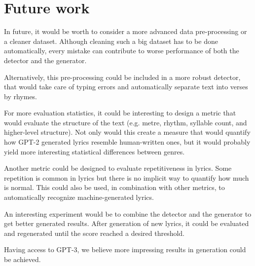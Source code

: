 \section*{Future work}
In future, it would be worth to consider a more advanced data pre-processing or a cleaner dataset. Although cleaning such a big dataset has to be done automatically, every mistake can contribute to worse performance of both the detector and the generator. 

Alternatively, this pre-processing could be included in a more robust detector, that would take care of typing errors and automatically separate text into verses by rhymes.

For more evaluation statistics, it could be interesting to design a metric that would evaluate the structure of the text (e.g. metre, rhythm, syllable count, and higher-level structure). Not only would this create a measure that would quantify how GPT-2 generated lyrics resemble human-written ones, but it would probably yield more interesting statistical differences between genres.

Another metric could be designed to evaluate repetitiveness in lyrics. Some repetition is common in lyrics but there is no implicit way to quantify how much is normal. This could also be used, in combination with other metrics, to automatically recognize machine-generated lyrics.

An interesting experiment would be to combine the detector and the generator to get better generated results. After generation of new lyrics, it could be evaluated and regenerated until the score reached a desired threshold.

Having access to GPT-3, we believe more impressing results in generation could be achieved.
